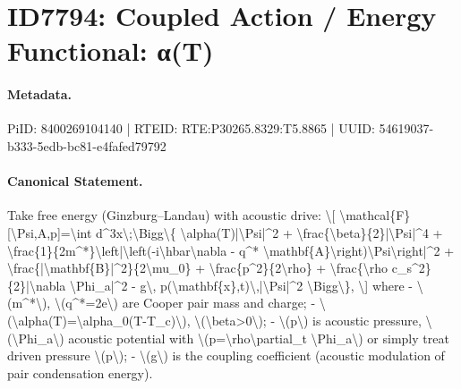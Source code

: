 \section*{ID7794: Coupled Action / Energy Functional: α(T)}
\paragraph{Metadata.}
PiID: 8400269104140 | RTEID: RTE:P30265.8329:T5.8865 | UUID: 54619037-b333-5edb-bc81-e4fafed79792

\paragraph{Canonical Statement.}
Take free energy (Ginzburg–Landau) with acoustic drive: \textbackslash{}[ \textbackslash{}mathcal\{F\}[\textbackslash{}Psi,A,p]=\textbackslash{}int d\textasciicircum{}3x\textbackslash{};\textbackslash{}Bigg\textbackslash{}\{ \textbackslash{}alpha(T)|\textbackslash{}Psi|\textasciicircum{}2 + \textbackslash{}frac\{\textbackslash{}beta\}\{2\}|\textbackslash{}Psi|\textasciicircum{}4 + \textbackslash{}frac\{1\}\{2m\textasciicircum{}*\}\textbackslash{}left|\textbackslash{}left(-i\textbackslash{}hbar\textbackslash{}nabla - q\textasciicircum{}* \textbackslash{}mathbf\{A\}\textbackslash{}right)\textbackslash{}Psi\textbackslash{}right|\textasciicircum{}2 + \textbackslash{}frac\{|\textbackslash{}mathbf\{B\}|\textasciicircum{}2\}\{2\textbackslash{}mu\_0\} + \textbackslash{}frac\{p\textasciicircum{}2\}\{2\textbackslash{}rho\} + \textbackslash{}frac\{\textbackslash{}rho c\_s\textasciicircum{}2\}\{2\}|\textbackslash{}nabla \textbackslash{}Phi\_a|\textasciicircum{}2 - g\textbackslash{}, p(\textbackslash{}mathbf\{x\},t)\textbackslash{},|\textbackslash{}Psi|\textasciicircum{}2 \textbackslash{}Bigg\textbackslash{}\}, \textbackslash{}] where - \textbackslash{}(m\textasciicircum{}*\textbackslash{}), \textbackslash{}(q\textasciicircum{}*=2e\textbackslash{}) are Cooper pair mass and charge; - \textbackslash{}(\textbackslash{}alpha(T)=\textbackslash{}alpha\_0(T-T\_c)\textbackslash{}), \textbackslash{}(\textbackslash{}beta>0\textbackslash{}); - \textbackslash{}(p\textbackslash{}) is acoustic pressure, \textbackslash{}(\textbackslash{}Phi\_a\textbackslash{}) acoustic potential with \textbackslash{}(p=\textbackslash{}rho\textbackslash{}partial\_t \textbackslash{}Phi\_a\textbackslash{}) or simply treat driven pressure \textbackslash{}(p\textbackslash{}); - \textbackslash{}(g\textbackslash{}) is the coupling coefficient (acoustic modulation of pair condensation energy).

